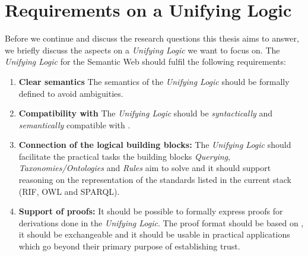 \section{Requirements on a Unifying Logic}\label{req}
Before we continue and discuss the research questions this thesis aims to answer, 
we briefly discuss the aspects on a \emph{Unifying Logic} we want to focus on. The \emph{Unifying Logic} for the Semantic Web should fulfil the following requirements:
\begin{enumerate}
\item \textbf{Clear semantics} %
The semantics of the \emph{Unifying Logic} should be formally defined to avoid ambiguities.
\item \textbf{Compatibility with \rdf} %
The \emph{Unifying Logic} should be \emph{syntactically} and \emph{semantically} compatible with \rdf.
\item \textbf{Connection of the logical building blocks:} %
The \emph{Unifying Logic}  should facilitate the practical tasks the 
 building blocks \emph{Querying}, \emph{Taxonomies/Ontologies}
and \emph{Rules} aim to solve and 
it should support reasoning on the \rdf representation of the standards listed in the current stack (\ie RIF, OWL and SPARQL).
\item \textbf{Support of proofs:} It should be possible to formally express proofs for derivations done in the \emph{Unifying Logic}. The proof format should be based on \rdf, it should be 
exchangeable and it should be usable in practical applications which go  beyond their primary purpose of establishing trust.
\end{enumerate}

